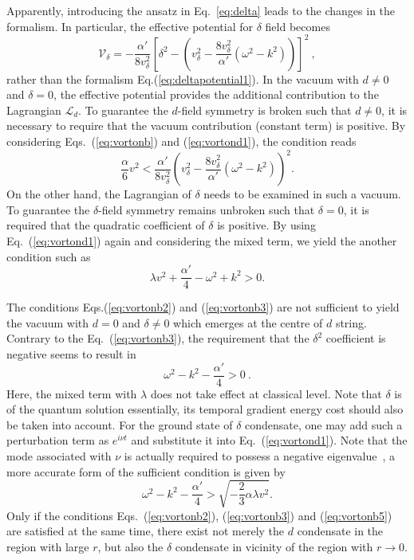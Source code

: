 \documentclass[12pt]{article}
\begin{document}
Apparently, introducing the ansatz in Eq.~\ref{eq:delta} leads to the changes in the formalism.
In particular, the effective potential for $\delta$ field becomes
\begin{equation}
  \label{eq:vortond1}
  \mathcal{V}_\delta= -\frac{\alpha'}{8v_\delta^2} [\delta^2 - (v_\delta^2 - \frac{8v_\delta^2}{\alpha'}(\omega^2 -k^2))]^2 \ ,
\end{equation}
rather than the formalism Eq.(\ref{eq:deltapotential1}).
In the vacuum with $d \neq 0$ and $\delta = 0$, the effective potential provides the additional
contribution to the Lagrangian $\mathcal{L}_d$. To guarantee the $d$-field symmetry is broken such
that $d \neq 0$, it is necessary to require that the vacuum contribution (constant term) is positive.
By considering Eqs.~(\ref{eq:vortonb}) and (\ref{eq:vortond1}), the condition reads
\begin{equation}
\label{eq:vortonb2}
  \frac{\alpha}{6} v^2 < \frac{\alpha'}{8v_\delta^2}(v_\delta^2  - \frac{8v_\delta^2}{\alpha'}(\omega^2 -k^2))^2.
\end{equation}
On the other hand, the Lagrangian of $\delta$ needs to be examined in such a vacuum. To guarantee the
$\delta$-field symmetry remains unbroken such that $\delta = 0$, it is required that the quadratic
coefficient of $\delta$ is positive. By using Eq.~(\ref{eq:vortond1}) again and considering the mixed
term, we yield the another condition such as
\begin{equation}
  \label{eq:vortonb3}
  \lambda v^2 + \frac{\alpha'}{4}- \omega^2 +k^2 > 0.
\end{equation}

The conditions Eqs.(\ref{eq:vortonb2}) and (\ref{eq:vortonb3}) are not sufficient to yield the vacuum
with $d = 0$ and $\delta \neq 0$ which emerges at the centre of $d$ string. Contrary to the
Eq.~(\ref{eq:vortonb3}), the requirement that the $\delta^2$ coefficient is negative seems to result in
\begin{equation}
  \label{eq:vortonb4}
\omega^2 - k^2 -\frac{\alpha'}{4} > 0 \ .
\end{equation}
Here, the mixed term with $\lambda$ does not take effect at classical level. Note that $\delta$ is of
the quantum solution essentially, its temporal gradient energy cost should also be taken into account.
For the ground state of $\delta$ condensate, one may add such a perturbation term as $e^{i\nu t}$ and
substitute it into Eq.~(\ref{eq:vortond1}). Note that the mode associated with $\nu$ is actually required
to possess a negative eigenvalue~\cite{vilenkin2000cosmic,haws1988superconducting}, a more accurate form
of the sufficient condition is given by
\begin{equation}
  \label{eq:vortonb5}
  \omega^2 - k^2 -\frac{\alpha'}{4} > \sqrt{- \frac{2}{3}\alpha \lambda v^2}.
\end{equation}
Only if the conditions Eqs.~(\ref{eq:vortonb2}), (\ref{eq:vortonb3}) and (\ref{eq:vortonb5}) are
satisfied at the same time, there exist not merely the $d$ condensate in the region with large $r$, but
also the $\delta$ condensate in vicinity of the region with $r \rightarrow 0$.
\end{document}
